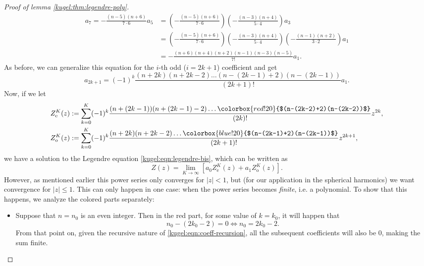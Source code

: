 \begin{proof}[Proof of lemma \ref{kugel:thm:legendre-poly}]
\begin{align*}
    a_{7} = -\frac{(n-5)(n+6)}{7\cdot 6} a_5
      &= \left( -\frac{(n-5)(n+6)}{7 \cdot 6} \right)
         \left( -\frac{(n-3)(n+4)}{5 \cdot 4} \right) a_3 \\
      &= \left( -\frac{(n-5)(n+6)}{7 \cdot 6} \right)
         \left( -\frac{(n-3)(n+4)}{5 \cdot 4} \right)
         \left( -\frac{(n-1)(n+2)}{3 \cdot 2} \right) a_1 \\
      &= -\frac{(n+6)(n+4)(n+2)(n-1)(n-3)(n-5)}{7!} a_1.
  \end{align*}
  As before, we can generalize this equation for the $i$-th odd ($i = 2k+1$)
  coefficient and get
  \begin{equation*}
    a_{2k+1} = (-1)^k \frac{(n + 2k)(n+2k-2)
      \hdots (n-(2k-1)+2)(n-(2k-1))}{(2k+1)!} a_1.
  \end{equation*}
  Now, if we let
  \begin{align*}
    Z_\text{e}^K(z) &:=
      \sum_{k=0}^K(-1)^k \frac{
        (n+(2k-1))(n+(2k-1)-2) \hdots
        \colorbox{red!20}{$(n-(2k-2)+2)(n-(2k-2))$}
      }{(2k)!} z^{2k}, \\
    Z_\text{o}^K(z) &:=
      \sum_{k=0}^K(-1)^k \frac{
        (n + 2k)(n+2k-2)\hdots \colorbox{blue!20}{$(n-(2k-1)+2)(n-(2k-1))$}
      }{(2k+1)!} z^{2k+1},
  \end{align*}
  we have a solution to the Legendre equation \eqref{kugel:eqn:legendre-bis},
  which can be written as
  \begin{equation} \label{kugel:eqn:legendre-powerseries}
    Z(z) = \lim_{K \to \infty} \left[
      a_0 Z_\text{e}^K(z) + a_1 Z_\text{o}^K(z)
    \right].
  \end{equation}
  However, as mentioned earlier this power series only converges for $|z| < 1$,
  but (for our application in the spherical harmonics) we want convergence for
  $|z| \leq 1$. This can only happen in one case: when the power series becomes
  \emph{finite}, i.e. a polynomial. To show that this happens, we analyze the
  colored parts separately:
  \begin{itemize}
    \item[\textcolor{red!80!black}{\textbullet}]
      Suppose that $n = n_0$ is an even integer. Then in the red part, for some
      value of $k=k_0$, it will happen that
      \begin{equation*}
        n_0-(2k_0-2)=0
        \iff
        n_0 = 2 k_0 - 2.
      \end{equation*}
      From that point on, given the recursive nature of
      \eqref{kugel:eqn:coeff-recursion}, all the subsequent coefficients will
      also be 0, making the sum finite.


\end{itemize}
\end{proof}
